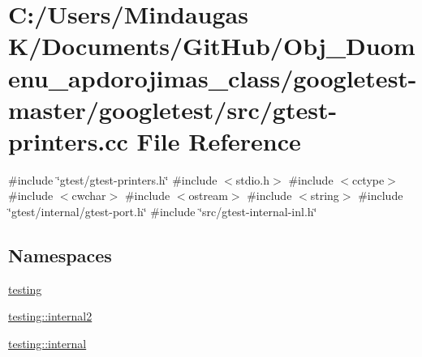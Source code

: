 \hypertarget{googletest-master_2googletest_2src_2gtest-printers_8cc}{}\section{C\+:/\+Users/\+Mindaugas K/\+Documents/\+Git\+Hub/\+Obj\+\_\+\+Duomenu\+\_\+apdorojimas\+\_\+class/googletest-\/master/googletest/src/gtest-\/printers.cc File Reference}
\label{googletest-master_2googletest_2src_2gtest-printers_8cc}
{\ttfamily \#include \char`\"{}gtest/gtest-\/printers.\+h\char`\"{}}\newline
{\ttfamily \#include $<$stdio.\+h$>$}\newline
{\ttfamily \#include $<$cctype$>$}\newline
{\ttfamily \#include $<$cwchar$>$}\newline
{\ttfamily \#include $<$ostream$>$}\newline
{\ttfamily \#include $<$string$>$}\newline
{\ttfamily \#include \char`\"{}gtest/internal/gtest-\/port.\+h\char`\"{}}\newline
{\ttfamily \#include \char`\"{}src/gtest-\/internal-\/inl.\+h\char`\"{}}\newline
\subsection*{Namespaces}
\begin{DoxyCompactItemize}
\item 
 \mbox{\hyperlink{namespacetesting}{testing}}
\item 
 \mbox{\hyperlink{namespacetesting_1_1internal2}{testing\+::internal2}}
\item 
 \mbox{\hyperlink{namespacetesting_1_1internal}{testing\+::internal}}
\end{DoxyCompactItemize}
